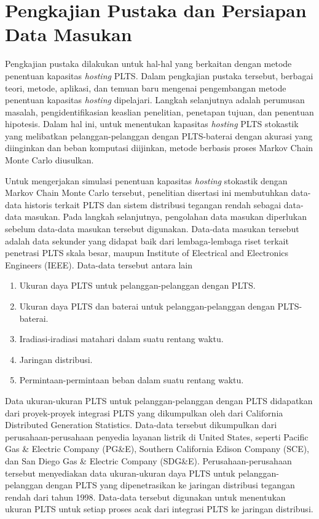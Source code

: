 \section{Pengkajian Pustaka dan Persiapan Data Masukan}
Pengkajian pustaka dilakukan untuk hal-hal yang berkaitan dengan metode penentuan kapasitas \textit{\textit{hosting}} PLTS. Dalam pengkajian pustaka tersebut, berbagai teori, metode, aplikasi, dan temuan baru mengenai pengembangan metode penentuan kapasitas \textit{\textit{hosting}} dipelajari. Langkah selanjutnya adalah perumusan masalah, pengidentifikasian keaslian penelitian, penetapan tujuan, dan penentuan hipotesis. Dalam hal ini, untuk menentukan kapasitas \textit{\textit{hosting}} PLTS stokastik yang melibatkan pelanggan-pelanggan dengan PLTS-baterai dengan akurasi yang diinginkan dan beban komputasi diijinkan, metode berbasis proses Markov Chain Monte Carlo diusulkan.

Untuk mengerjakan simulasi penentuan kapasitas \textit{\textit{hosting}} stokastik dengan Markov Chain Monte Carlo tersebut, penelitian disertasi ini membutuhkan data-data historis terkait PLTS dan sistem distribusi tegangan rendah sebagai data-data masukan. Pada langkah selanjutnya, pengolahan data masukan diperlukan sebelum data-data masukan tersebut digunakan. Data-data masukan tersebut adalah data sekunder yang didapat baik dari lembaga-lembaga riset terkait penetrasi PLTS skala besar, maupun Institute of Electrical and Electronics Engineers (IEEE). Data-data tersebut antara lain
\begin{enumerate}
	\item Ukuran daya PLTS untuk pelanggan-pelanggan dengan PLTS.
	\item Ukuran daya PLTS dan baterai untuk pelanggan-pelanggan dengan PLTS-baterai.
	\item Iradiasi-iradiasi matahari dalam suatu rentang waktu.
	\item Jaringan distribusi.
	\item Permintaan-permintaan beban dalam suatu rentang waktu.
\end{enumerate}

Data ukuran-ukuran PLTS untuk pelanggan-pelanggan dengan PLTS didapatkan dari proyek-proyek integrasi PLTS yang dikumpulkan oleh dari California Distributed Generation Statistics. Data-data tersebut dikumpulkan dari perusahaan-perusahaan penyedia layanan listrik di United States, seperti Pacific Gas \& Electric Company (PG\&E), Southern California Edison Company (SCE), dan San Diego Gas \& Electric Company (SDG\&E). Perusahaan-perusahaan tersebut menyediakan data ukuran-ukuran daya PLTS untuk pelanggan-pelanggan dengan PLTS yang dipenetrasikan ke jaringan distribusi tegangan rendah dari tahun 1998. Data-data tersebut digunakan untuk menentukan ukuran PLTS untuk setiap proses acak dari integrasi PLTS ke jaringan distribusi.

